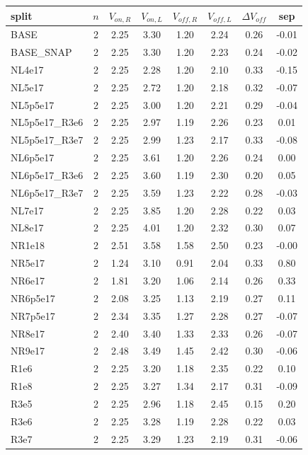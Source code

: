 \begin{tabular}{@{}l@{\,}c@{\,}c@{\,}c@{\,}c@{\,}c@{\,}c@{\,}c@{}}\toprule
split & $n$ & $V_{on,R}$ & $V_{on,L}$ & $V_{off,R}$ & $V_{off,L}$ & $\Delta V_{off}$ & sep \\ \midrule
BASE & 2 & 2.25 & 3.30 & 1.20 & 2.24 & 0.26 & -0.01 \\
BASE\_SNAP & 2 & 2.25 & 3.30 & 1.20 & 2.23 & 0.24 & -0.02 \\
NL4e17 & 2 & 2.25 & 2.28 & 1.20 & 2.10 & 0.33 & -0.15 \\
NL5e17 & 2 & 2.25 & 2.72 & 1.20 & 2.18 & 0.32 & -0.07 \\
NL5p5e17 & 2 & 2.25 & 3.00 & 1.20 & 2.21 & 0.29 & -0.04 \\
NL5p5e17\_R3e6 & 2 & 2.25 & 2.97 & 1.19 & 2.26 & 0.23 & 0.01 \\
NL5p5e17\_R3e7 & 2 & 2.25 & 2.99 & 1.23 & 2.17 & 0.33 & -0.08 \\
NL6p5e17 & 2 & 2.25 & 3.61 & 1.20 & 2.26 & 0.24 & 0.00 \\
NL6p5e17\_R3e6 & 2 & 2.25 & 3.60 & 1.19 & 2.30 & 0.20 & 0.05 \\
NL6p5e17\_R3e7 & 2 & 2.25 & 3.59 & 1.23 & 2.22 & 0.28 & -0.03 \\
NL7e17 & 2 & 2.25 & 3.85 & 1.20 & 2.28 & 0.22 & 0.03 \\
NL8e17 & 2 & 2.25 & 4.01 & 1.20 & 2.32 & 0.30 & 0.07 \\
NR1e18 & 2 & 2.51 & 3.58 & 1.58 & 2.50 & 0.23 & -0.00 \\
NR5e17 & 2 & 1.24 & 3.10 & 0.91 & 2.04 & 0.33 & 0.80 \\
NR6e17 & 2 & 1.81 & 3.20 & 1.06 & 2.14 & 0.26 & 0.33 \\
NR6p5e17 & 2 & 2.08 & 3.25 & 1.13 & 2.19 & 0.27 & 0.11 \\
NR7p5e17 & 2 & 2.34 & 3.35 & 1.27 & 2.28 & 0.27 & -0.07 \\
NR8e17 & 2 & 2.40 & 3.40 & 1.33 & 2.33 & 0.26 & -0.07 \\
NR9e17 & 2 & 2.48 & 3.49 & 1.45 & 2.42 & 0.30 & -0.06 \\
R1e6 & 2 & 2.25 & 3.20 & 1.18 & 2.35 & 0.22 & 0.10 \\
R1e8 & 2 & 2.25 & 3.27 & 1.34 & 2.17 & 0.31 & -0.09 \\
R3e5 & 2 & 2.25 & 2.96 & 1.18 & 2.45 & 0.15 & 0.20 \\
R3e6 & 2 & 2.25 & 3.28 & 1.19 & 2.28 & 0.22 & 0.03 \\
R3e7 & 2 & 2.25 & 3.29 & 1.23 & 2.19 & 0.31 & -0.06 \\

\end{tabular}
